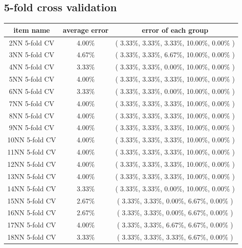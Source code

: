 \documentclass[11pt,a4paper]{article}
\begin{document}
\subsection{5-fold cross validation}
\begin{center}
    \begin{tabular} {|| c | c | c ||}
        \hline
        item name & average error & error of each group \\ \hline
        2NN 5-fold CV & 4.00\% & ( 3.33\%, 3.33\%, 3.33\%, 10.00\%, 0.00\% ) \\ \hline
        3NN 5-fold CV & 4.67\% & ( 3.33\%, 3.33\%, 6.67\%, 10.00\%, 0.00\% ) \\ \hline
        4NN 5-fold CV & 3.33\% & ( 3.33\%, 3.33\%, 0.00\%, 10.00\%, 0.00\% ) \\ \hline
        5NN 5-fold CV & 4.00\% & ( 3.33\%, 3.33\%, 3.33\%, 10.00\%, 0.00\% ) \\ \hline
        6NN 5-fold CV & 3.33\% & ( 3.33\%, 3.33\%, 0.00\%, 10.00\%, 0.00\% ) \\ \hline
        7NN 5-fold CV & 4.00\% & ( 3.33\%, 3.33\%, 3.33\%, 10.00\%, 0.00\% ) \\ \hline
        8NN 5-fold CV & 4.00\% & ( 3.33\%, 3.33\%, 3.33\%, 10.00\%, 0.00\% ) \\ \hline
        9NN 5-fold CV & 4.00\% & ( 3.33\%, 3.33\%, 3.33\%, 10.00\%, 0.00\% ) \\ \hline
        10NN 5-fold CV & 4.00\% & ( 3.33\%, 3.33\%, 3.33\%, 10.00\%, 0.00\% ) \\ \hline
        11NN 5-fold CV & 4.00\% & ( 3.33\%, 3.33\%, 3.33\%, 10.00\%, 0.00\% ) \\ \hline
        12NN 5-fold CV & 4.00\% & ( 3.33\%, 3.33\%, 3.33\%, 10.00\%, 0.00\% ) \\ \hline
        13NN 5-fold CV & 4.00\% & ( 3.33\%, 3.33\%, 3.33\%, 10.00\%, 0.00\% ) \\ \hline
        14NN 5-fold CV & 3.33\% & ( 3.33\%, 3.33\%, 0.00\%, 10.00\%, 0.00\% ) \\ \hline
        15NN 5-fold CV & 2.67\% & ( 3.33\%, 3.33\%, 0.00\%, 6.67\%, 0.00\% ) \\ \hline
        16NN 5-fold CV & 2.67\% & ( 3.33\%, 3.33\%, 0.00\%, 6.67\%, 0.00\% ) \\ \hline
        17NN 5-fold CV & 4.00\% & ( 3.33\%, 3.33\%, 6.67\%, 6.67\%, 0.00\% ) \\ \hline
        18NN 5-fold CV & 3.33\% & ( 3.33\%, 3.33\%, 3.33\%, 6.67\%, 0.00\% ) \\ \hline

\end{tabular}
\end{center}
\end{document}
